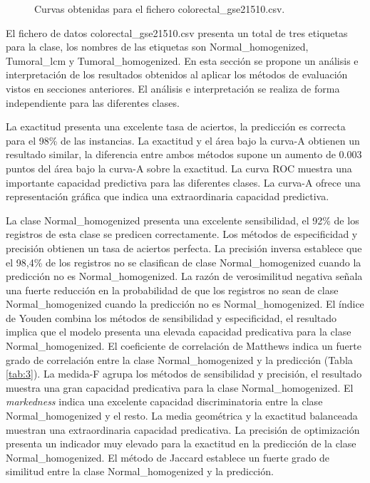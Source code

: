 \bigbreak

\begin{figure}[htp]
    \centering
    \caption{Curvas obtenidas para el fichero colorectal\_gse21510.csv.}
    \label{fig:12}
\end{figure}

\bigbreak

El fichero de datos colorectal\_gse21510.csv presenta un total de tres etiquetas para la clase, los nombres de las etiquetas son Normal\_homogenized, Tumoral\_lcm y Tumoral\_homogenized. En esta sección se propone un análisis e interpretación de los resultados obtenidos al aplicar los métodos de evaluación vistos en secciones anteriores. El análisis e interpretación se realiza de forma independiente para las diferentes clases.

\bigbreak

La exactitud presenta una excelente tasa de aciertos, la predicción es correcta para el 98\% de las instancias. La exactitud y el área bajo la curva-A obtienen un resultado similar, la diferencia entre ambos métodos supone un aumento de $0.003$ puntos del área bajo la curva-A sobre la exactitud. La curva ROC muestra una importante capacidad predictiva para las diferentes clases. La curva-A ofrece una representación gráfica que indica una extraordinaria capacidad predictiva.

\bigbreak

La clase Normal\_homogenized presenta una excelente sensibilidad, el 92\% de los registros de esta clase se predicen correctamente. Los métodos de especificidad y precisión obtienen un tasa de aciertos perfecta. La precisión inversa establece que el 98,4\% de los registros no se clasifican de clase Normal\_homogenized cuando la predicción no es Normal\_homogenized. La razón de verosimilitud negativa señala una fuerte reducción en la probabilidad de que los registros no sean de clase Normal\_homogenized cuando la predicción no es Normal\_homogenized. El índice de Youden combina los métodos de sensibilidad y especificidad, el resultado implica que el modelo presenta una elevada capacidad predicativa para la clase Normal\_homogenized. El coeficiente de correlación de Matthews indica un fuerte grado de correlación entre la clase Normal\_homogenized y la predicción (Tabla \ref{tab:3}). La medida-F agrupa los métodos de sensibilidad y precisión, el resultado muestra una gran capacidad predicativa para la clase Normal\_homogenized. El \textit{markedness} indica una excelente capacidad discriminatoria entre la clase Normal\_homogenized y el resto. La media geométrica y la exactitud balanceada muestran una extraordinaria capacidad predicativa. La precisión de optimización presenta un indicador muy elevado para la exactitud en la predicción de la clase Normal\_homogenized. El método de Jaccard establece un fuerte grado de similitud entre la clase Normal\_homogenized y la predicción.

